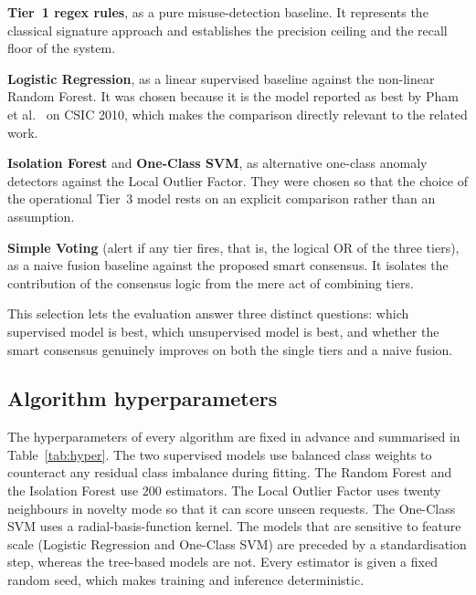 \documentclass[../main.tex]{subfiles}
\begin{document}
\begin{romanlist}
  \item \textbf{Tier~1 regex rules}, as a pure misuse-detection baseline.
        It represents the classical signature approach and establishes the
        precision ceiling and the recall floor of the system.
  \item \textbf{Logistic Regression}, as a linear supervised baseline against
        the non-linear Random Forest. It was chosen because it is the model
        reported as best by Pham et al.~\cite{pham2016} on CSIC 2010, which
        makes the comparison directly relevant to the related work.
  \item \textbf{Isolation Forest} and \textbf{One-Class SVM}, as alternative
        one-class anomaly detectors against the Local Outlier Factor. They
        were chosen so that the choice of the operational Tier~3 model rests
        on an explicit comparison rather than an assumption.
  \item \textbf{Simple Voting} (alert if any tier fires, that is, the logical
        OR of the three tiers), as a naive fusion baseline against the
        proposed smart consensus. It isolates the contribution of the
        consensus logic from the mere act of combining tiers.
\end{romanlist}

This selection lets the evaluation answer three distinct questions: which
supervised model is best, which unsupervised model is best, and whether the
smart consensus genuinely improves on both the single tiers and a naive
fusion.

\subsection{Algorithm hyperparameters}
\label{sec:sim-hyper}

The hyperparameters of every algorithm are fixed in advance and summarised in
Table~\ref{tab:hyper}. The two supervised models use balanced class weights
to counteract any residual class imbalance during fitting. The Random Forest
and the Isolation Forest use $200$ estimators. The Local Outlier Factor uses
twenty neighbours in novelty mode so that it can score unseen requests. The
One-Class SVM uses a radial-basis-function kernel. The models that are
sensitive to feature scale (Logistic Regression and One-Class SVM) are
preceded by a standardisation step, whereas the tree-based models are not.
Every estimator is given a fixed random seed, which makes training and
inference deterministic.
\end{document}
